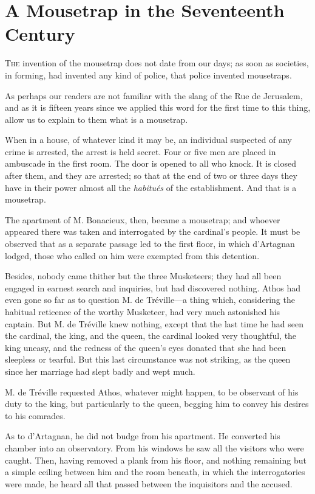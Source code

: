 
\chapter{A Mousetrap in the Seventeenth Century}

\lettrine[]{T}{he} invention of the mousetrap does not date from our days; as soon as societies, in forming, had invented any kind of police, that police invented mousetraps. 

\zz
As perhaps our readers are not familiar with the slang of the Rue de Jerusalem, and as it is fifteen years since we applied this word for the first time to this thing, allow us to explain to them what is a mousetrap. 

When in a house, of whatever kind it may be, an individual suspected of any crime is arrested, the arrest is held secret. Four or five men are placed in ambuscade in the first room. The door is opened to all who knock. It is closed after them, and they are arrested; so that at the end of two or three days they have in their power almost all the \textit{habitués} of the establishment. And that is a mousetrap. 

The apartment of M. Bonacieux, then, became a mousetrap; and whoever appeared there was taken and interrogated by the cardinal's people. It must be observed that as a separate passage led to the first floor, in which d'Artagnan lodged, those who called on him were exempted from this detention. 

Besides, nobody came thither but the three Musketeers; they had all been engaged in earnest search and inquiries, but had discovered nothing. Athos had even gone so far as to question M. de Tréville---a thing which, considering the habitual reticence of the worthy Musketeer, had very much astonished his captain. But M. de Tréville knew nothing, except that the last time he had seen the cardinal, the king, and the queen, the cardinal looked very thoughtful, the king uneasy, and the redness of the queen's eyes donated that she had been sleepless or tearful. But this last circumstance was not striking, as the queen since her marriage had slept badly and wept much. 

M. de Tréville requested Athos, whatever might happen, to be observant of his duty to the king, but particularly to the queen, begging him to convey his desires to his comrades. 

As to d'Artagnan, he did not budge from his apartment. He converted his chamber into an observatory. From his windows he saw all the visitors who were caught. Then, having removed a plank from his floor, and nothing remaining but a simple ceiling between him and the room beneath, in which the interrogatories were made, he heard all that passed between the inquisitors and the accused. 

